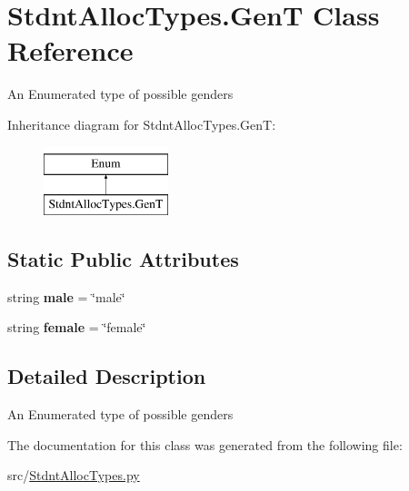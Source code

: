 \hypertarget{class_stdnt_alloc_types_1_1_gen_t}{}\section{Stdnt\+Alloc\+Types.\+GenT Class Reference}
\label{class_stdnt_alloc_types_1_1_gen_t}


An Enumerated type of possible genders  


Inheritance diagram for Stdnt\+Alloc\+Types.\+GenT\+:\begin{figure}[H]
\begin{center}
\leavevmode
\includegraphics[height=2.000000cm]{class_stdnt_alloc_types_1_1_gen_t}
\end{center}
\end{figure}
\subsection*{Static Public Attributes}
\begin{DoxyCompactItemize}
\item 
\mbox{\label{class_stdnt_alloc_types_1_1_gen_t_aeae560b694f78e0f03043f37da016eb4}} 
string {\bfseries male} = \char`\"{}male\char`\"{}
\item 
\mbox{\label{class_stdnt_alloc_types_1_1_gen_t_ad35b4a5d9eb1c3ef88bdd1fcad214d33}} 
string {\bfseries female} = \char`\"{}female\char`\"{}
\end{DoxyCompactItemize}


\subsection{Detailed Description}
An Enumerated type of possible genders 

The documentation for this class was generated from the following file\+:\begin{DoxyCompactItemize}
\item 
src/\hyperlink{_stdnt_alloc_types_8py}{Stdnt\+Alloc\+Types.\+py}\end{DoxyCompactItemize}
